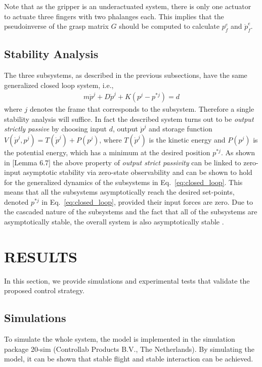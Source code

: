 \documentclass[a4paper, 10pt, conference]{ieeeconf}
\renewcommand{\cdot}{}  %
\begin{document}
Note that as the gripper is an underactuated system, there is only one actuator to actuate three fingers with two phalanges each. This implies that the pseudoinverse of the grasp matrix $G$ should be computed to calculate $p_f^e$ and $\dot{p}_f^e$.


\subsection{Stability Analysis}
\label{sec:stability}
The three subsystems, as described in the previous subsections, have the same generalized closed
loop system, i.e.,
\begin{align}
m \ddot{p}^j + D \dot{p}^j + K \cdot (p^j - p^{*j}) = d
\label{eq:closed_loop}
\end{align}
where $j$ denotes the frame that corresponds to
the subsystem. Therefore a single stability analysis will suffice. In
fact the described system turns out to be \emph{output strictly
  passive} \cite{prentice} by choosing input $d$, output $\dot{p}^j$ and
storage function $V(\dot{p}^j,p^j) = T(\dot{p}^j) + P(p^j)$,
where $T(\dot{p}^j)$ is the kinetic energy and $P(p^j)$ is the potential energy, which has a minimum at the desired position $p^{*j}$. As shown in
\cite{prentice}[Lemma 6.7] the above property of \emph{output strict
  passivity} can be linked to zero-input asymptotic stability via
zero-state observability and can be shown to hold for the generalized
dynamics of the subsystems in Eq.~\ref{eq:closed_loop}. This means that all the subsystems asymptotically reach the desired
set-points, denoted $p^{*j}$ in Eq.~\ref{eq:closed_loop}, provided
their input forces are zero. Due to the cascaded nature of the subsystems and the fact that all of
the subsystems are asymptotically stable, the overall system is also
asymptotically stable \cite{hogan}.


\section{RESULTS}
\label{sec:simulation}
In this section, we provide simulations and experimental tests that validate the proposed control strategy.

\subsection{Simulations}
To simulate the whole system, the model is implemented in the
simulation package 20-sim (Controllab Products B.V., The Netherlands). By simulating the model, it
can be shown that stable flight and stable interaction can be
achieved.
\end{document}
